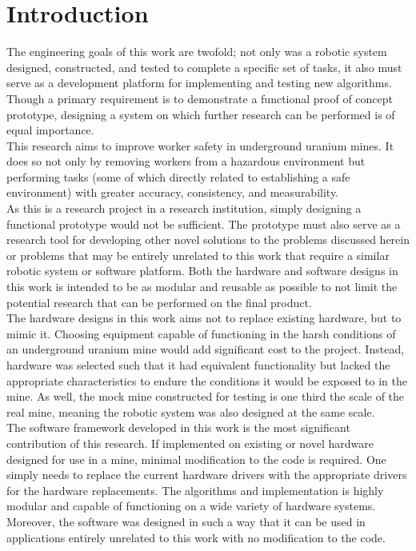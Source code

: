 \chapter{Introduction}
\label{chap:introduction}

The engineering goals of this work are twofold; not only was a robotic system designed, constructed, and tested to complete a specific set of tasks, it also must serve as a development platform for implementing and testing new algorithms. Though a primary requirement is to demonstrate a functional proof of concept prototype, designing a system on which further research can be performed is of equal importance.\\

This research aims to improve worker safety in underground uranium mines. It does so not only by removing workers from a hazardous environment but performing tasks (some of which directly related to establishing a safe environment) with greater accuracy, consistency, and measurability.\\

As this is a research project in a research institution, simply designing a functional prototype would not be sufficient. The prototype must also serve as a research tool for developing other novel solutions to the problems discussed herein or problems that may be entirely unrelated to this work that require a similar robotic system or software platform. Both the hardware and software designs in this work is intended to be as modular and reusable as possible to not limit the potential research that can be performed on the final product.\\

The hardware designs in this work aims not to replace existing hardware, but to mimic it. Choosing equipment capable of functioning in the harsh conditions of an underground uranium mine would add significant cost to the project. Instead, hardware was selected such that it had equivalent functionality but lacked the appropriate characteristics to endure the conditions it would be exposed to in the mine. As well, the mock mine constructed for testing is one third the scale of the real mine, meaning the robotic system was also designed at the same scale.\\

The software framework developed in this work is the most significant contribution of this research. If implemented on existing or novel hardware designed for use in a mine, minimal modification to the code is required. One simply needs to replace the current hardware drivers with the appropriate drivers for the hardware replacements. The algorithms and implementation is highly modular and capable of functioning on a wide variety of hardware systems. Moreover, the software was designed in such a way that it can be used in applications entirely unrelated to this work with no modification to the code.\\

